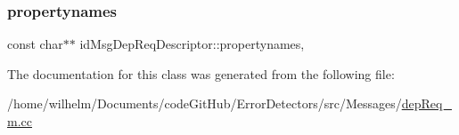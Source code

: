 \subsubsection{\texorpdfstring{propertynames}{propertynames}}
{\footnotesize\ttfamily const char$\ast$$\ast$ id\+Msg\+Dep\+Req\+Descriptor\+::propertynames\hspace{0.3cm}{\ttfamily [mutable]}, {\ttfamily [private]}}



The documentation for this class was generated from the following file\+:\begin{DoxyCompactItemize}
\item 
/home/wilhelm/\+Documents/code\+Git\+Hub/\+Error\+Detectors/src/\+Messages/\hyperlink{dep_req__m_8cc}{dep\+Req\+\_\+m.\+cc}\end{DoxyCompactItemize}
